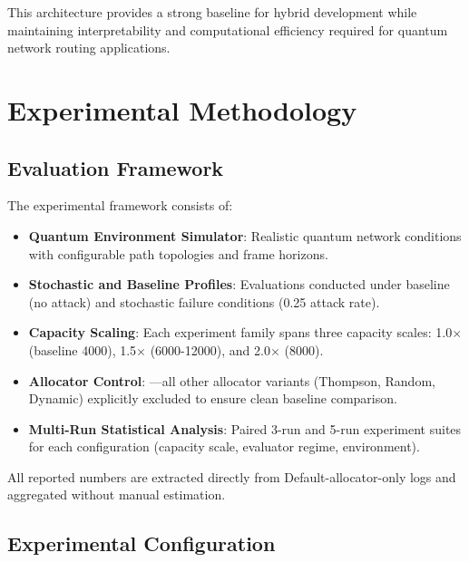 \documentclass[12pt,a4paper]{article}
\begin{document}
This architecture provides a strong baseline for hybrid development while maintaining interpretability and computational efficiency required for quantum network routing applications.

\section{Experimental Methodology}

\subsection{Evaluation Framework}

The experimental framework consists of:

\begin{itemize}
    \item \textbf{Quantum Environment Simulator}: Realistic quantum network conditions with configurable path topologies and frame horizons.
    \item \textbf{Stochastic and Baseline Profiles}: Evaluations conducted under baseline (no attack) and stochastic failure conditions (0.25 attack rate).
    \item \textbf{Capacity Scaling}: Each experiment family spans three capacity scales: 1.0$\times$ (baseline 4000), 1.5$\times$ (6000-12000), and 2.0$\times$ (8000).
    \item \textbf{Allocator Control}: —all other allocator variants (Thompson, Random, Dynamic) explicitly excluded to ensure clean baseline comparison.
    \item \textbf{Multi-Run Statistical Analysis}: Paired 3-run and 5-run experiment suites for each configuration (capacity scale, evaluator regime, environment).
\end{itemize}

All reported numbers are extracted directly from Default-allocator-only logs and aggregated without manual estimation.

\subsection{Experimental Configuration}
\end{document}
